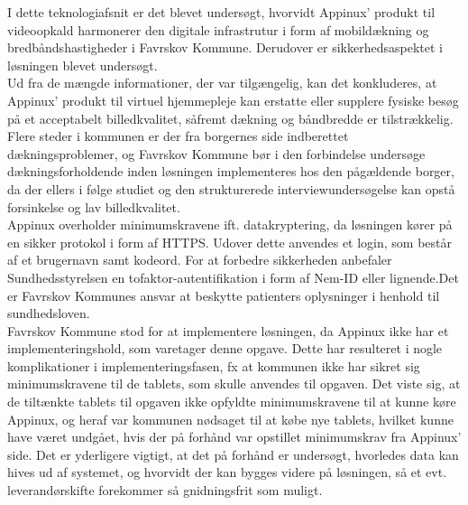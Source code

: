 I dette teknologiafsnit er det blevet undersøgt, hvorvidt Appinux’ produkt til videoopkald harmonerer den digitale infrastrutur i form af mobildækning og bredbåndshastigheder i Favrskov Kommune. Derudover er sikkerhedsaspektet i løsningen blevet undersøgt.\\
Ud fra de mængde informationer, der var tilgængelig, kan det konkluderes, at Appinux’ produkt til virtuel hjemmepleje kan erstatte eller supplere fysiske besøg på et acceptabelt billedkvalitet, såfremt dækning og båndbredde er tilstrækkelig.
\\Flere steder i kommunen er der fra borgernes side indberettet dækningsproblemer, og Favrskov Kommune bør i den forbindelse undersøge dækningsforholdende inden løsningen implementeres hos den pågældende borger, da der ellers i følge studiet og den strukturerede interviewundersøgelse kan opstå forsinkelse og lav billedkvalitet.\\
Appinux overholder minimumskravene ift. datakryptering, da løsningen kører på en sikker protokol i form af HTTPS. Udover dette anvendes et login, som består af et brugernavn samt kodeord. For at forbedre sikkerheden anbefaler Sundhedsstyrelsen en tofaktor-autentifikation i form af Nem-ID eller lignende.Det er Favrskov Kommunes ansvar at beskytte patienters oplysninger i henhold til sundhedsloven.\\ 
Favrskov Kommune stod for at implementere løsningen, da Appinux ikke har et implementeringshold, som varetager denne opgave. Dette har resulteret i nogle komplikationer i implementeringsfasen, fx at kommunen ikke har sikret sig minimumskravene til de tablets, som skulle anvendes til opgaven. Det viste sig, at de tiltænkte tablets til opgaven ikke opfyldte minimumskravene til at kunne køre Appinux, og heraf var kommunen nødsaget til at købe nye tablets, hvilket kunne have været undgået, hvis der på forhånd var opstillet minimumskrav fra Appinux' side. Det er yderligere vigtigt, at det på forhånd er undersøgt, hvorledes data kan hives ud af systemet, og hvorvidt der kan bygges videre på løsningen, så et evt. leverandørskifte forekommer så gnidningsfrit som muligt.
